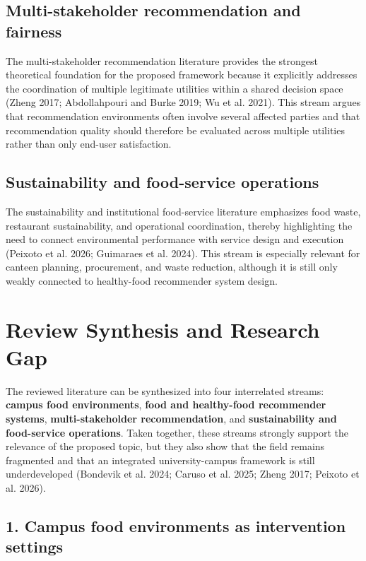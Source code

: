 \documentclass[
  letterpaper,
  DIV=11,
  numbers=noendperiod]{scrartcl}
\begin{document}
\subsection{Multi-stakeholder recommendation and
fairness}\label{multi-stakeholder-recommendation-and-fairness}

The multi-stakeholder recommendation literature provides the strongest
theoretical foundation for the proposed framework because it explicitly
addresses the coordination of multiple legitimate utilities within a
shared decision space (Zheng 2017; Abdollahpouri and Burke 2019; {Wu et
al.} 2021). This stream argues that recommendation environments often
involve several affected parties and that recommendation quality should
therefore be evaluated across multiple utilities rather than only
end-user satisfaction.

\subsection{Sustainability and food-service
operations}\label{sustainability-and-food-service-operations}

The sustainability and institutional food-service literature emphasizes
food waste, restaurant sustainability, and operational coordination,
thereby highlighting the need to connect environmental performance with
service design and execution ({Peixoto et al.} 2026; {Guimaraes et al.}
2024). This stream is especially relevant for canteen planning,
procurement, and waste reduction, although it is still only weakly
connected to healthy-food recommender system design.

\section{Review Synthesis and Research
Gap}\label{review-synthesis-and-research-gap}

The reviewed literature can be synthesized into four interrelated
streams: \textbf{campus food environments}, \textbf{food and
healthy-food recommender systems}, \textbf{multi-stakeholder
recommendation}, and \textbf{sustainability and food-service
operations}. Taken together, these streams strongly support the
relevance of the proposed topic, but they also show that the field
remains fragmented and that an integrated university-campus framework is
still underdeveloped ({Bondevik et al.} 2024; {Caruso et al.} 2025;
Zheng 2017; {Peixoto et al.} 2026).

\subsection{1. Campus food environments as intervention
settings}\label{campus-food-environments-as-intervention-settings}
\end{document}
